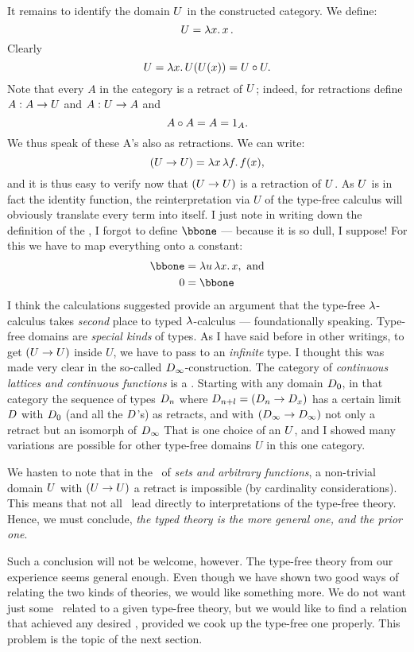 It remains to identify the domain $U$ in the constructed category. We define:
$$
\U = \lm{x}. x\, .
$$
Clearly
$$
\U = \lm{x}.U(U(x)) = \U \comp \U .
$$
Note that every $A$ in the category is a retract of $U$; indeed, for retractions define
$A : A \rightarrow U$ and $A: U\rightarrow A$ and
$$
A \circ A = A = {\mathrm 1}_A.
$$
We thus speak of these A's also as retractions. We can write:
$$
(\U\to \U) = \lmm{x}{f}. f(x),
$$
and it is thus easy to verify now that $(U\rightarrow U)$ is a retraction of $U$. As $U$ is in
fact the identity function, the reinterpretation via $U$ of the type-free calculus will
obviously translate every term into itself. I just note in writing down the definition of
the \ccc, I forgot to define $\bbone$ --- because it is so dull, I suppose! For this we
have to map everything onto a constant:
\begin{align*}
\bbone &= \lmm{u}{x}.x, {\textrm{ and}} \\
\zeromap &= \bbone
\end{align*}
I think the calculations suggested provide an argument that the type-free $\lambda$-calculus
takes {\it second} place to typed $\lambda$-calculus --- foundationally speaking. Type-free
domains are \emph{special kinds} of types. As I have said before in other writings, to get
$(U \rightarrow U)$ inside $U$, we have to pass to an {\it infinite} type. I thought this was
made very clear in the so-called $D_{\infty}$-construction. The category of
\emph{continuous lattices and continuous functions} is a \ccc. Starting with any domain
$D_0$, in that category the sequence of types $D_n$ where $D_{n+l} =  (D_n \rightarrow D_x)$
has a certain limit $D$ with $D_0$ (and all the $D$'s) as retracts, and with
$(D_\infty \rightarrow D_\infty)$ not only a retract but an isomorph of $D_\infty$ That is one
choice of an $U$, and I showed many variations are possible for other type-free domains
$U$ in this one category.

We hasten to note that in the \ccc\ of {\it sets and arbitrary functions}, a non-trivial
domain $U$ with $(U\rightarrow U)$ a retract is impossible (by cardinality considerations).
This means that not all \ccc\ lead directly to interpretations of the type-free theory.
Hence, we must conclude, {\it the typed theory is the more general one, and the prior
one}.

Such a conclusion will not be welcome, however. The type-free theory from our experience
seems general enough. Even though we have shown two good ways of relating the two kinds of
theories, we would like something more. We do not want just some \ccc\ related to a given
type-free theory, but we would like to find a relation that achieved any desired \ccc,
provided we cook up the type-free one properly. This problem is the topic of the next
section.


